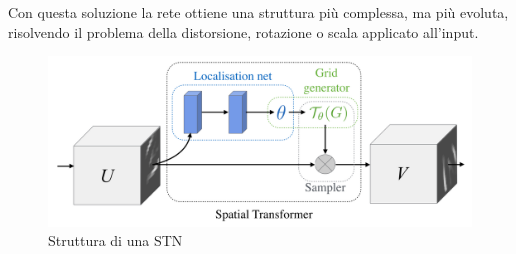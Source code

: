 \documentclass[a4paper,12pt]{article}
\begin{document}
Con questa soluzione la rete ottiene una struttura più complessa, ma più evoluta, risolvendo il problema della distorsione, rotazione o scala applicato all'input.

\begin{figure}
\centering
\includegraphics[width=1\linewidth]{images/stn.png}
\caption{Struttura di una STN}
\label{stn_structure}
\end{figure}
\end{document}
